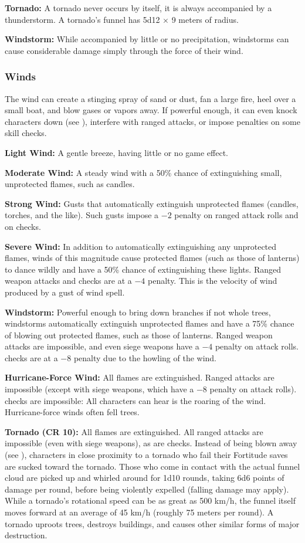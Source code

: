 \textbf{Tornado:} A tornado never occurs by itself, it is always accompanied by a thunderstorm. A tornado's funnel has 5d12 $\times$ 9 meters of radius.

\textbf{Windstorm:} While accompanied by little or no precipitation, windstorms can cause considerable damage simply through the force of their wind.

\subsubsection{Winds}
The wind can create a stinging spray of sand or dust, fan a large fire, heel over a small boat, and blow gases or vapors away. If powerful enough, it can even knock characters down (see ), interfere with ranged attacks, or impose penalties on some skill checks.

\textbf{Light Wind:} A gentle breeze, having little or no game effect.

\textbf{Moderate Wind:} A steady wind with a 50\% chance of extinguishing small, unprotected flames, such as candles.

\textbf{Strong Wind:} Gusts that automatically extinguish unprotected flames (candles, torches, and the like). Such gusts impose a $-2$ penalty on ranged attack rolls and on  checks.

\textbf{Severe Wind:} In addition to automatically extinguishing any unprotected flames, winds of this magnitude cause protected flames (such as those of lanterns) to dance wildly and have a 50\% chance of extinguishing these lights. Ranged weapon attacks and  checks are at a $-4$ penalty. This is the velocity of wind produced by a gust of wind spell.

\textbf{Windstorm:} Powerful enough to bring down branches if not whole trees, windstorms automatically extinguish unprotected flames and have a 75\% chance of blowing out protected flames, such as those of lanterns. Ranged weapon attacks are impossible, and even siege weapons have a $-4$ penalty on attack rolls.  checks are at a $-8$ penalty due to the howling of the wind.

\textbf{Hurricane-Force Wind:} All flames are extinguished. Ranged attacks are impossible (except with siege weapons, which have a $-8$ penalty on attack rolls).  checks are impossible: All characters can hear is the roaring of the wind. Hurricane-force winds often fell trees.

\textbf{Tornado (CR 10):} All flames are extinguished. All ranged attacks are impossible (even with siege weapons), as are  checks. Instead of being blown away (see ), characters in close proximity to a tornado who fail their Fortitude saves are sucked toward the tornado. Those who come in contact with the actual funnel cloud are picked up and whirled around for 1d10 rounds, taking 6d6 points of damage per round, before being violently expelled (falling damage may apply). While a tornado's rotational speed can be as great as 500 km/h, the funnel itself moves forward at an average of 45 km/h (roughly 75 meters per round). A tornado uproots trees, destroys buildings, and causes other similar forms of major destruction.
